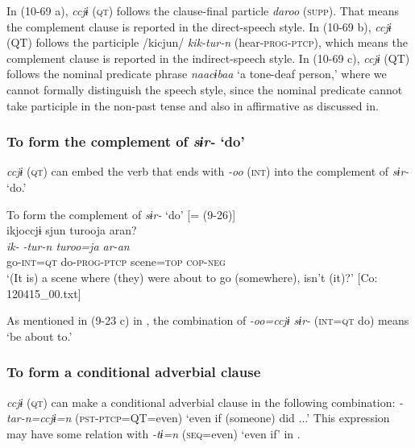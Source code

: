 In (10-69 a), \textit{ccjɨ} (\textsc{qt}) follows the clause-final particle \textit{daroo} (\textsc{supp}). That means the complement clause is reported in the direct-speech style. In (10-69 b), \textit{ccjɨ} (QT) follows the participle /kicjun/ \textit{kik-tur-n} (hear-\textsc{prog}-\textsc{ptcp}), which means the complement clause is reported in the indirect-speech style. In (10-69 c), \textit{ccjɨ} (QT) follows the nominal predicate phrase \textit{naacɨbaa} ‘a tone-deaf person,’ where we cannot formally distinguish the speech style, since the nominal predicate cannot take participle in the non-past tense and also in affirmative as discussed in.

\subsubsection{To form the complement of \textit{sɨr-} ‘do’}\label{sec:10.4.1.3}

\textit{ccjɨ} (\textsc{qt}) can embed the verb that ends with \textit{{}-oo} (\textsc{int}) into the complement of \textit{sɨr-} ‘do.’

\ea\label{ex:10.70}   To form the complement of \textit{sɨr-} ‘do’ [= (9-26)]\\
      \glll    ikjoccjɨ  sjun  turooja  aran?\\
    \textit{ik-}  \textit{-tur-n  turoo=ja  ar-an}\\
    go-\textsc{int}=\textsc{qt}  do-\textsc{prog}-\textsc{ptcp}  scene=\textsc{top}  \textsc{cop}-\textsc{neg}\\
\glt     ‘(It is) a scene where (they) were about to go (somewhere), isn’t (it)?’  [Co: 120415\_00.txt]
\z

As mentioned in (9-23 c) in , the combination of \textit{{}-oo=ccjɨ sɨr-} (\textsc{int}=\textsc{qt} do) means ‘be about to.’

\subsubsection{To form a conditional adverbial clause}\label{sec:10.4.1.4}

\textit{ccjɨ} (\textsc{qt}) can make a conditional adverbial clause in the following combination: \textit{{}-tar-n=ccjɨ=n} (\textsc{pst}-\textsc{ptcp}=QT=even) ‘even if (someone) did ...’ This expression may have some relation with \textit{{}-tɨ=n} (\textsc{seq}=even) ‘even if’ in .


